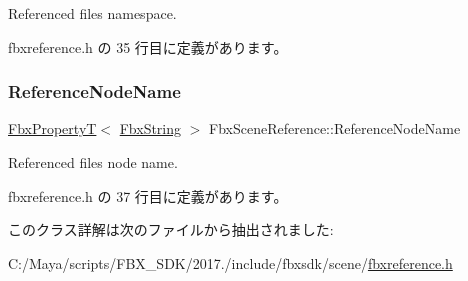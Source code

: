 Referenced file\textquotesingle{}s namespace. 



 fbxreference.\+h の 35 行目に定義があります。

\mbox{\label{class_fbx_scene_reference_a322d144d3a3e9d641132c7f65c924c2b}} 
\subsubsection{\texorpdfstring{Reference\+Node\+Name}{ReferenceNodeName}}
{\footnotesize\ttfamily \hyperlink{class_fbx_property_t}{Fbx\+PropertyT}$<$ \hyperlink{class_fbx_string}{Fbx\+String} $>$ Fbx\+Scene\+Reference\+::\+Reference\+Node\+Name}



Referenced file\textquotesingle{}s node name. 



 fbxreference.\+h の 37 行目に定義があります。



このクラス詳解は次のファイルから抽出されました\+:\begin{DoxyCompactItemize}
\item 
C\+:/\+Maya/scripts/\+F\+B\+X\+\_\+\+S\+D\+K/2017./include/fbxsdk/scene/\hyperlink{fbxreference_8h}{fbxreference.\+h}\end{DoxyCompactItemize}

